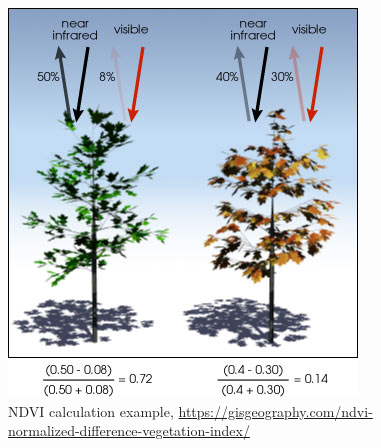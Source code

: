 \begin{frame}
\begin{columns}
\begin{figure}
    \centering
    \begin{minipage}{.75\columnwidth}
    \includegraphics[width=\linewidth]{final/figures/ndvi-example.png}
    \caption{\tiny{NDVI calculation example, \url{https://gisgeography.com/ndvi-normalized-difference-vegetation-index/}}}
    \end{minipage}
\end{figure}
\vspace*{-.5cm}
\end{columns}
\end{frame}


